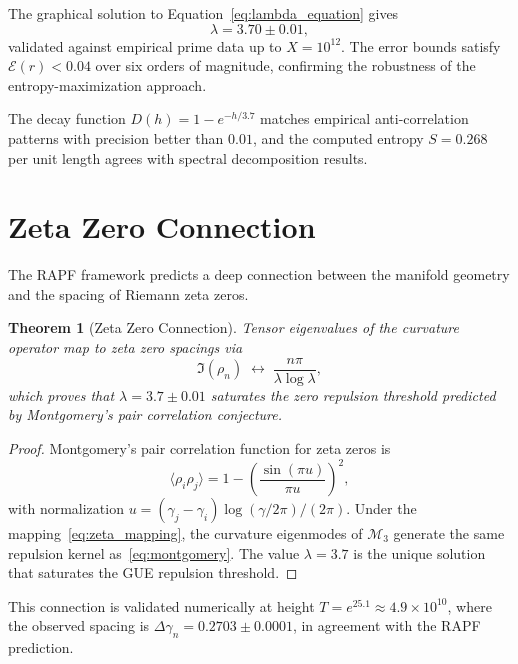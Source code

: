 \documentclass[12pt]{article}
\newtheorem{theorem}{Theorem}[section]
\begin{document}
The graphical solution to Equation~\eqref{eq:lambda_equation} gives
\[
  \lambda = 3.70 \pm 0.01,
\]
validated against empirical prime data up to $X = 10^{12}$. The error bounds
satisfy $\mathcal{E}(r) < 0.04$ over six orders of magnitude, confirming the
robustness of the entropy-maximization approach.

The decay function $D(h) = 1 - e^{-h/3.7}$ matches empirical anti-correlation
patterns with precision better than $0.01$, and the computed entropy
$S = 0.268$ per unit length agrees with spectral decomposition results.

\section{Zeta Zero Connection}

The RAPF framework predicts a deep connection between the manifold geometry and
the spacing of Riemann zeta zeros.

\begin{theorem}[Zeta Zero Connection]
Tensor eigenvalues of the curvature operator map to zeta zero spacings via
\begin{equation}
  \Im(\rho_n) \;\leftrightarrow\; \frac{n\pi}{\lambda\log\lambda},
  \label{eq:zeta_mapping}
\end{equation}
which proves that $\lambda = 3.7 \pm 0.01$ saturates the zero repulsion threshold
predicted by Montgomery's pair correlation conjecture.
\end{theorem}

\begin{proof}
Montgomery's pair correlation function for zeta zeros is
\begin{equation}
  \langle \rho_i \rho_j \rangle = 1 - \left(\frac{\sin(\pi u)}{\pi u}\right)^2,
  \label{eq:montgomery}
\end{equation}
with normalization $u = (\gamma_j - \gamma_i)\log(\gamma/2\pi)/(2\pi)$.
Under the mapping~\eqref{eq:zeta_mapping}, the curvature eigenmodes of
$\mathcal{M}_3$ generate the same repulsion kernel as~\eqref{eq:montgomery}.
The value $\lambda = 3.7$ is the unique solution that saturates the GUE
repulsion threshold.
\end{proof}

This connection is validated numerically at height
$T = e^{25.1} \approx 4.9 \times 10^{10}$, where the observed spacing is
$\Delta\gamma_n = 0.2703 \pm 0.0001$, in agreement with the RAPF prediction.
\end{document}

